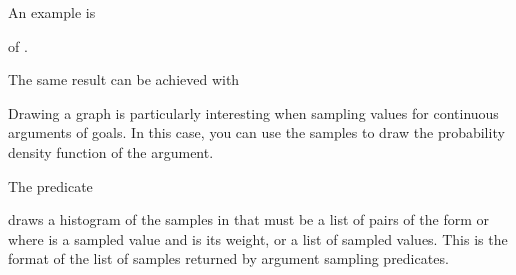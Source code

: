 \documentclass[letterpaper,10pt,english]{sphinxmanual}
\begin{document}
\sphinxAtStartPar
An example is

\begin{sphinxVerbatim}[commandchars=\\\{\}]
 \PYG{p}{[}\PYG{p}{]}
\end{sphinxVerbatim}

\sphinxAtStartPar
of .

\sphinxAtStartPar
The same result can be achieved with

\begin{sphinxVerbatim}[commandchars=\\\{\}]
 
\end{sphinxVerbatim}

\sphinxAtStartPar
Drawing a graph is particularly interesting when sampling values for continuous arguments of goals.
In this case, you can use the samples to draw the probability density function of the argument.

\sphinxAtStartPar
The predicate

\begin{sphinxVerbatim}[commandchars=\\\{\}]
  
\end{sphinxVerbatim}

\sphinxAtStartPar
draws a histogram of the samples in  that must be a list of pairs of the
form  or  where  is a sampled value and  is its weight,
or a list of sampled values.
This is the format of the list of samples returned by argument sampling predicates.
\end{document}
